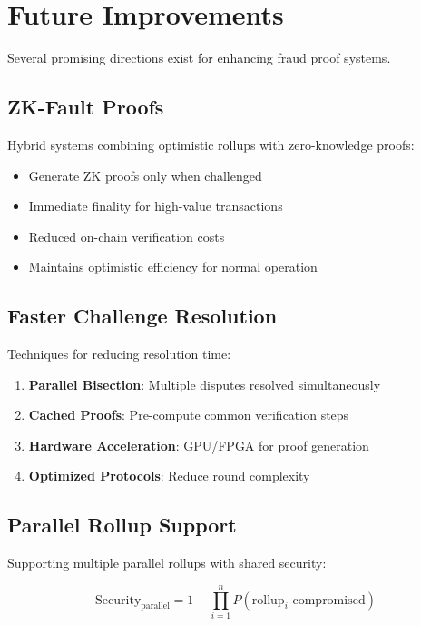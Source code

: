 \section{Future Improvements}


Several promising directions exist for enhancing fraud proof systems.

\subsection{ZK-Fault Proofs}

Hybrid systems combining optimistic rollups with zero-knowledge proofs:

\begin{itemize}
    \item Generate ZK proofs only when challenged
    \item Immediate finality for high-value transactions
    \item Reduced on-chain verification costs
    \item Maintains optimistic efficiency for normal operation
\end{itemize}

\subsection{Faster Challenge Resolution}

Techniques for reducing resolution time:

\begin{enumerate}
    \item \textbf{Parallel Bisection}: Multiple disputes resolved simultaneously
    \item \textbf{Cached Proofs}: Pre-compute common verification steps
    \item \textbf{Hardware Acceleration}: GPU/FPGA for proof generation
    \item \textbf{Optimized Protocols}: Reduce round complexity
\end{enumerate}

\subsection{Parallel Rollup Support}

Supporting multiple parallel rollups with shared security:

\begin{equation}
\text{Security}_{\text{parallel}} = 1 - \prod_{i=1}^{n} P(\text{rollup}_i \text{ compromised})
\end{equation}

